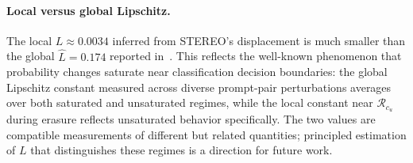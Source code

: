 \paragraph{Local versus global Lipschitz.}
The local $L \approx 0.0034$ inferred from STEREO's displacement is much smaller than the global $\hat L = 0.174$ reported in~. This reflects the well-known phenomenon that probability changes saturate near classification decision boundaries: the global Lipschitz constant measured across diverse prompt-pair perturbations averages over both saturated and unsaturated regimes, while the local constant near $\mathcal{R}_{c_u}$ during erasure reflects unsaturated behavior specifically. The two values are compatible measurements of different but related quantities; principled estimation of $L$ that distinguishes these regimes is a direction for future work.
